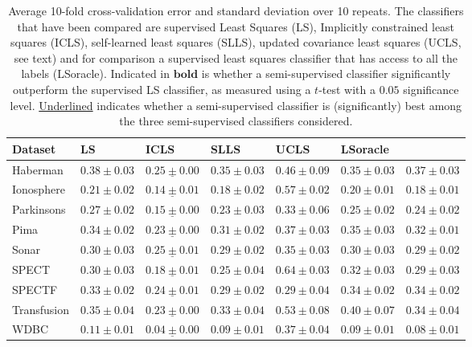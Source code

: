 \begin{table}
\caption{Average 10-fold cross-validation error and standard deviation over 10 repeats. The classifiers that have been compared are supervised Least Squares (LS), Implicitly constrained least squares (ICLS), self-learned least squares (SLLS), updated covariance least squares (UCLS, see text) and for comparison a supervised least squares classifier that has access to all the labels (LSoracle). Indicated in $\mathbf{bold}$ is whether a semi-supervised classifier significantly outperform the supervised LS classifier, as measured using a $t$-test with a $0.05$ significance level. \underline{Underlined} indicates whether a semi-supervised classifier is (significantly) best among the three semi-supervised classifiers considered.} \label{table:cvresults}
\begin{tabular}{l|llllll}
Dataset & LS & ICLS & SLLS & UCLS & LSoracle \\ 
\hline
Haberman & $0.38 \pm 0.03$& $\mathbf{\underline{0.25 \pm 0.00}} $& $0.35 \pm 0.03$& $0.46 \pm 0.09$& $0.35 \pm 0.03$& $0.37 \pm 0.03$\\ 
Ionosphere & $0.21 \pm 0.02$& $\mathbf{\underline{0.14 \pm 0.01}} $& $\mathbf{0.18 \pm 0.02} $& $0.57 \pm 0.02$& $0.20 \pm 0.01$& $\mathbf{0.18 \pm 0.01} $\\ 
Parkinsons & $0.27 \pm 0.02$& $\mathbf{\underline{0.15 \pm 0.00}} $& $\mathbf{0.23 \pm 0.03} $& $0.33 \pm 0.06$& $0.25 \pm 0.02$& $\mathbf{0.24 \pm 0.02} $\\ 
Pima & $0.34 \pm 0.02$& $\mathbf{\underline{0.23 \pm 0.00}} $& $\mathbf{0.31 \pm 0.02} $& $0.37 \pm 0.03$& $0.35 \pm 0.03$& $\mathbf{0.32 \pm 0.01} $\\ 
Sonar & $0.30 \pm 0.03$& $\mathbf{\underline{0.25 \pm 0.01}} $& $0.29 \pm 0.02$& $0.35 \pm 0.03$& $0.30 \pm 0.03$& $0.29 \pm 0.02$\\ 
SPECT & $0.30 \pm 0.03$& $\mathbf{\underline{0.18 \pm 0.01}} $& $\mathbf{0.25 \pm 0.04} $& $0.64 \pm 0.03$& $0.32 \pm 0.03$& $0.29 \pm 0.03$\\ 
SPECTF & $0.33 \pm 0.02$& $\mathbf{\underline{0.24 \pm 0.01}} $& $\mathbf{0.29 \pm 0.02} $& $\mathbf{0.29 \pm 0.04} $& $0.34 \pm 0.02$& $0.34 \pm 0.02$\\ 
Transfusion & $0.35 \pm 0.04$& $\mathbf{\underline{0.23 \pm 0.00}} $& $0.33 \pm 0.04$& $0.53 \pm 0.08$& $0.40 \pm 0.07$& $0.34 \pm 0.04$\\ 
WDBC & $0.11 \pm 0.01$& $\mathbf{\underline{0.04 \pm 0.00}} $& $\mathbf{0.09 \pm 0.01} $& $0.37 \pm 0.04$& $0.09 \pm 0.01$& $\mathbf{0.08 \pm 0.01} $\\ 
\end{tabular}
\end{table}

